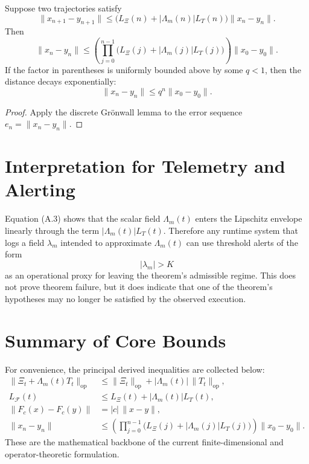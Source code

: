 \documentclass[11pt]{article}
\begin{document}
\begin{proposition}
Suppose two trajectories satisfy
\[
\|x_{n+1}-y_{n+1}\| \le \bigl(L_{\Xi}(n)+|\Lambda_m(n)|L_T(n)\bigr)\|x_n-y_n\|. \tag{A.13}
\]
Then
\[
\|x_n-y_n\| \le \left(\prod_{j=0}^{n-1}\bigl(L_{\Xi}(j)+|\Lambda_m(j)|L_T(j)\bigr)\right)\|x_0-y_0\|. \tag{A.14}
\]
If the factor in parentheses is uniformly bounded above by some $q<1$, then the distance decays exponentially:
\[
\|x_n-y_n\| \le q^n \|x_0-y_0\|. \tag{A.15}
\]
\end{proposition}

\begin{proof}
Apply the discrete Gr\"onwall lemma to the error sequence $e_n=\|x_n-y_n\|$.
\end{proof}

\section{Interpretation for Telemetry and Alerting}
Equation \textup{(A.3)} shows that the scalar field $\Lambda_m(t)$ enters the Lipschitz envelope linearly through the term $|\Lambda_m(t)|L_T(t)$. Therefore any runtime system that logs a field $\lambda_m$ intended to approximate $\Lambda_m(t)$ can use threshold alerts of the form
\[
|\lambda_m| > K \tag{A.16}
\]
as an operational proxy for leaving the theorem's admissible regime. This does not prove theorem failure, but it does indicate that one of the theorem's hypotheses may no longer be satisfied by the observed execution.

\section{Summary of Core Bounds}
For convenience, the principal derived inequalities are collected below:
\begin{align*}
\|\Xi_t + \Lambda_m(t)T_t\|_{\mathrm{op}} &\le \|\Xi_t\|_{\mathrm{op}} + |\Lambda_m(t)|\,\|T_t\|_{\mathrm{op}}, \\
L_{\mathcal{F}}(t) &\le L_{\Xi}(t) + |\Lambda_m(t)|L_T(t), \\
\|F_c(x)-F_c(y)\| &= |c|\,\|x-y\|, \\
\|x_n-y_n\| &\le \left(\prod_{j=0}^{n-1}\bigl(L_{\Xi}(j)+|\Lambda_m(j)|L_T(j)\bigr)\right)\|x_0-y_0\|.
\end{align*}
These are the mathematical backbone of the current finite-dimensional and operator-theoretic formulation.

\nocite{*}
  
  
\end{document}
